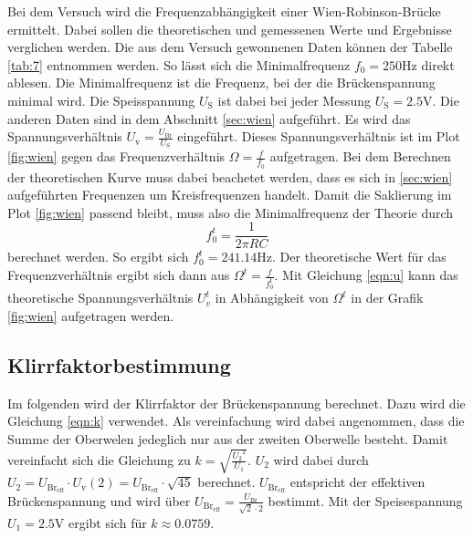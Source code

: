 Bei dem Versuch wird die Frequenzabhängigkeit einer Wien-Robinson-Brücke ermittelt. Dabei sollen die theoretischen und gemessenen Werte und Ergebnisse verglichen werden.
Die aus dem Versuch gewonnenen Daten können der Tabelle \ref{tab:7} entnommen werden. So lässt sich die Minimalfrequenz
$f_0=250\si{\hertz}$ direkt ablesen. Die Minimalfrequenz ist die Frequenz, bei der die Brückenspannung minimal wird. Die Speisspannung 
$U_{\text{S}}$ ist dabei bei jeder Messung $U_{\text{S}}=2.5 \si{\volt}$. Die anderen Daten sind in dem Abschnitt \ref{sec:wien} aufgeführt.
Es wird das Spannungsverhältnis $U_{\text{v}}=\frac{U_{\text{Br}}}{U_{\text{S}}}$ eingeführt. Dieses Spannungsverhältnis ist im Plot \ref{fig:wien}
gegen das Frequenzverhältnis $\Omega=\frac{f}{f_0}$ aufgetragen. Bei dem Berechnen der theoretischen Kurve muss dabei beachetet werden,
dass es sich in \ref{sec:wien} aufgeführten Frequenzen um Kreisfrequenzen handelt. Damit die Saklierung im Plot \ref{fig:wien} passend bleibt,
muss also die Minimalfrequenz der Theorie durch 
\begin{equation}
    f_{0}^{t}=\frac{1}{2\pi RC}
\end{equation} 
berechnet werden. So ergibt sich $f_{0}^{t}=241.14\si{\hertz}$. Der theoretische Wert für das Frequenzverhältnis ergibt sich dann aus $\Omega^{t}=\frac{f}{f_{0}^{t}}$.
Mit Gleichung \eqref{eqn:u} kann das theoretische Spannungsverhältnis $U_{v}^{t}$ in Abhängigkeit von $\Omega^{t}$ in der Grafik
\ref{fig:wien} aufgetragen werden.

\subsection{Klirrfaktorbestimmung} %
\label{sub:Klirrfaktorbestimmung}

Im folgenden wird der Klirrfaktor der Brückenspannung berechnet. Dazu wird die Gleichung \eqref{eqn:k} verwendet. 
Als vereinfachung wird dabei angenommen, dass die Summe der Oberwelen jedeglich nur aus der zweiten Oberwelle besteht.
Damit vereinfacht sich die Gleichung zu $k = \sqrt{\frac{ {U_2}^2}{U_1}}$. $U_2$ wird dabei durch $U_2=U_{\text{Br}_\text{eff}}\cdot U_{\text{v}}(2)=U_{\text{Br}_\text{eff}}\cdot \sqrt{45}$ berechnet.
$U_{\text{Br}_\text{eff}}$ entspricht der effektiven Brückenspannung und wird über $U_{\text{Br}_\text{eff}}=\frac{U_{\text{Br}}}{\sqrt{2}\cdot2}$ bestimmt.
Mit der Speisespannung $U_1=2.5\si{\volt}$ ergibt sich für $k\approx 0.0759$.
 




%
